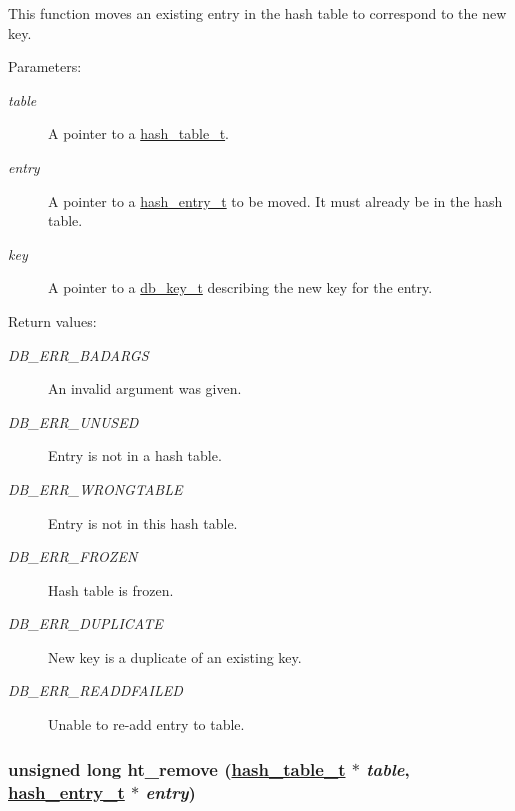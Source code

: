 This function moves an existing entry in the hash table to correspond to the new key.\begin{Desc}
\item[Parameters: ]\par
\begin{description}
\item[{\em 
table}]A pointer to a \hyperlink{group__dbprim__hash_a0}{hash\_\-table\_\-t}. \item[{\em 
entry}]A pointer to a \hyperlink{group__dbprim__hash_a1}{hash\_\-entry\_\-t} to be moved. It must already be in the hash table. \item[{\em 
key}]A pointer to a \hyperlink{group__dbprim_a0}{db\_\-key\_\-t} describing the new key for the entry.\end{description}
\end{Desc}
\begin{Desc}
\item[Return values: ]\par
\begin{description}
\item[{\em 
DB\_\-ERR\_\-BADARGS}]An invalid argument was given. \item[{\em 
DB\_\-ERR\_\-UNUSED}]Entry is not in a hash table. \item[{\em 
DB\_\-ERR\_\-WRONGTABLE}]Entry is not in this hash table. \item[{\em 
DB\_\-ERR\_\-FROZEN}]Hash table is frozen. \item[{\em 
DB\_\-ERR\_\-DUPLICATE}]New key is a duplicate of an existing key. \item[{\em 
DB\_\-ERR\_\-READDFAILED}]Unable to re-add entry to table. \end{description}
\end{Desc}
\hypertarget{group__dbprim__hash_a9}{
\subsubsection[ht\_\-remove]{\setlength{\rightskip}{0pt plus 5cm}unsigned long ht\_\-remove (\hyperlink{group__dbprim__hash_a0}{hash\_\-table\_\-t} $\ast$ {\em table}, \hyperlink{group__dbprim__hash_a1}{hash\_\-entry\_\-t} $\ast$ {\em entry})}}
\label{group__dbprim__hash_a9}


